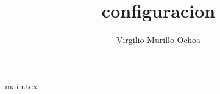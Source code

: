 \documentclass[12pt]{article}
\title{configuracion}
\author{Virgilio Murillo Ochoa}
\begin{document}
{main.tex}
\end{document}
